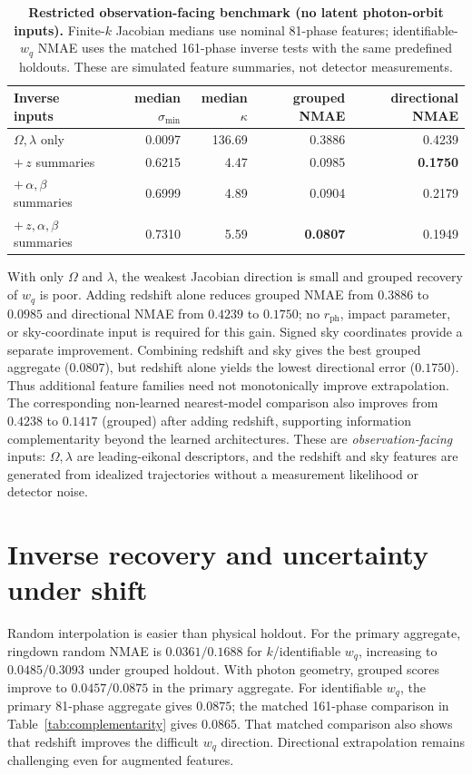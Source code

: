 \documentclass{article}
\newcommand{\smin}{\sigma_{\min}}
\begin{document}
\begin{table}[H]
\caption{\textbf{Restricted observation-facing benchmark (no latent photon-orbit inputs).} Finite-$k$ Jacobian medians use nominal 81-phase features; identifiable-$w_q$ NMAE uses the matched 161-phase inverse tests with the same predefined holdouts. These are simulated feature summaries, not detector measurements.}
\label{tab:restricted}
\centering\small
\begin{tabular}{lrrrr}
\toprule
Inverse inputs & median $\smin$ & median $\kappa$ & grouped NMAE & directional NMAE\\
\midrule
$\Omega,\lambda$ only & 0.0097 & 136.69 & 0.3886 & 0.4239\\
$+\,z$ summaries & 0.6215 & 4.47 & 0.0985 & \textbf{0.1750}\\
$+\,\alpha,\beta$ summaries & 0.6999 & 4.89 & 0.0904 & 0.2179\\
$+\,z,\alpha,\beta$ summaries & 0.7310 & 5.59 & \textbf{0.0807} & 0.1949\\
\bottomrule
\end{tabular}
\end{table}

With only $\Omega$ and $\lambda$, the weakest Jacobian direction is small and grouped recovery of $w_q$ is poor. Adding redshift alone reduces grouped NMAE from $0.3886$ to $0.0985$ and directional NMAE from $0.4239$ to $0.1750$; no $r_{\mathrm{ph}}$, impact parameter, or sky-coordinate input is required for this gain. Signed sky coordinates provide a separate improvement. Combining redshift and sky gives the best grouped aggregate ($0.0807$), but redshift alone yields the lowest directional error ($0.1750$). Thus additional feature families need not monotonically improve extrapolation. The corresponding non-learned nearest-model comparison also improves from $0.4238$ to $0.1417$ (grouped) after adding redshift, supporting information complementarity beyond the learned architectures. These are \emph{observation-facing} inputs: $\Omega,\lambda$ are leading-eikonal descriptors, and the redshift and sky features are generated from idealized trajectories without a measurement likelihood or detector noise.

\section{Inverse recovery and uncertainty under shift}
Random interpolation is easier than physical holdout. For the primary aggregate, ringdown random NMAE is $0.0361/0.1688$ for $k$/identifiable $w_q$, increasing to $0.0485/0.3093$ under grouped holdout. With photon geometry, grouped scores improve to $0.0457/0.0875$ in the primary aggregate. For identifiable $w_q$, the primary 81-phase aggregate gives $0.0875$; the matched 161-phase comparison in Table~\ref{tab:complementarity} gives $0.0865$. That matched comparison also shows that redshift improves the difficult $w_q$ direction. Directional extrapolation remains challenging even for augmented features.
\end{document}
